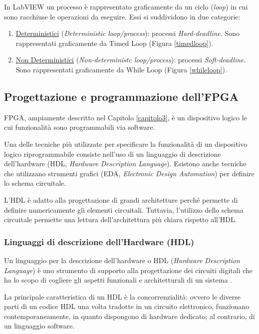 In LabVIEW un processo è rappresentato graficamente da un ciclo (\textit{loop}) in cui sono racchiuse le operazioni da eseguire. Essi si suddividono in due categorie:
\begin{enumerate}
	\item \underline{Deterministici} (\textit{Deterministic loop/process}): processi \textit{Hard-deadline}. Sono rappresentati graficamente da Timed Loop (Figura \ref{timedloop}).
	\item \underline{Non Deterministici} (\textit{Non-deterministc loop/process}): processi \textit{Soft-deadline}. Sono rappresentati graficamente da While Loop (Figura \ref{whileloop}).
\end{enumerate}

\subsection{Progettazione e programmazione dell'FPGA}
FPGA, ampiamente descritto nel Capitolo \ref{capitolo3}, è un dispositivo logico le cui funzionalità sono programmabili via software.

Una delle tecniche più utilizzate per specificare la funzionalità di un dispositivo logico riprogrammabile consiste nell'uso di un linguaggio di descrizione dell'hardware (HDL, \textit{Hardware Description Language}). Esistono anche tecniche che utilizzano strumenti grafici (EDA, \textit{Electronic Design Automation}) per definire lo schema circuitale.

L'HDL è adatto alla progettazione di grandi architetture perché permette di definire numericamente gli elementi circuitali. Tuttavia, l'utilizzo dello schema circuitale permette una lettura dell'architettura più chiara rispetto all'HDL.

\subsubsection{Linguaggi di descrizione dell'Hardware (HDL)}
Un linguaggio per la descrizione dell'hardware o HDL (\textit{Hardware Description Language}) è uno strumento di supporto alla progettazione dei circuiti digitali che ha lo scopo di cogliere gli aspetti funzionali e architetturali di un sistema \cite{fornacia}.

La principale caratteristica di un HDL è la concorrenzialità: ovvero le diverse parti di un codice HDL una volta tradotte in un circuito elettronico, funzionano contemporaneamente, in quanto dispongono di hardware dedicato; al contrario, di un linguaggio software.

